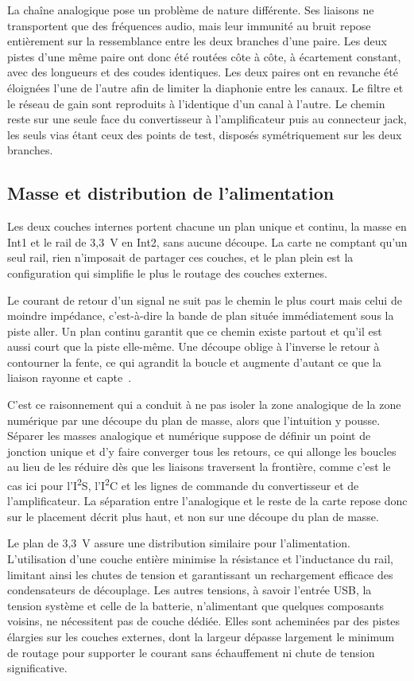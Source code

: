 La chaîne analogique pose un problème de nature différente. Ses liaisons ne transportent que des fréquences audio, mais leur immunité au bruit repose entièrement sur la ressemblance entre les deux branches d'une paire. Les deux pistes d'une même paire ont donc été routées côte à côte, à écartement constant, avec des longueurs et des coudes identiques. Les deux paires ont en revanche été éloignées l'une de l'autre afin de limiter la diaphonie entre les canaux. Le filtre et le réseau de gain sont reproduits à l'identique d'un canal à l'autre. Le chemin reste sur une seule face du convertisseur à l'amplificateur puis au connecteur jack, les seuls vias étant ceux des points de test, disposés symétriquement sur les deux branches.

\subsection{Masse et distribution de l'alimentation}

Les deux couches internes portent chacune un plan unique et continu, la masse en Int1 et le rail de 3,3~V en Int2, sans aucune découpe. La carte ne comptant qu'un seul rail, rien n'imposait de partager ces couches, et le plan plein est la configuration qui simplifie le plus le routage des couches externes.

Le courant de retour d'un signal ne suit pas le chemin le plus court mais celui de moindre impédance, c'est-à-dire la bande de plan située immédiatement sous la piste aller. Un plan continu garantit que ce chemin existe partout et qu'il est aussi court que la piste elle-même. Une découpe oblige à l'inverse le retour à contourner la fente, ce qui agrandit la boucle et augmente d'autant ce que la liaison rayonne et capte~\cite{prof_bogatin_rules_2013}.

C'est ce raisonnement qui a conduit à ne pas isoler la zone analogique de la zone numérique par une découpe du plan de masse, alors que l'intuition y pousse. Séparer les masses analogique et numérique suppose de définir un point de jonction unique et d'y faire converger tous les retours, ce qui allonge les boucles au lieu de les réduire dès que les liaisons traversent la frontière, comme c'est le cas ici pour l'I\textsuperscript{2}S, l'I\textsuperscript{2}C et les lignes de commande du convertisseur et de l'amplificateur. La séparation entre l'analogique et le reste de la carte repose donc sur le placement décrit plus haut, et non sur une découpe du plan de masse.

Le plan de 3,3~V assure une distribution similaire pour l'alimentation. L'utilisation d'une couche entière minimise la résistance et l'inductance du rail, limitant ainsi les chutes de tension et garantissant un rechargement efficace des condensateurs de découplage. Les autres tensions, à savoir l'entrée USB, la tension système et celle de la batterie, n'alimentant que quelques composants voisins, ne nécessitent pas de couche dédiée. Elles sont acheminées par des pistes élargies sur les couches externes, dont la largeur dépasse largement le minimum de routage pour supporter le courant sans échauffement ni chute de tension significative.

